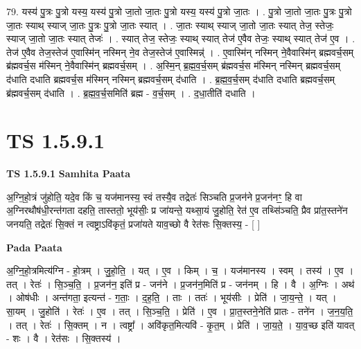 \documentclass[17pt]{extarticle}
\begin{document}
79. यस्य॑ पु॒त्रः पु॒त्रो यस्य॒ यस्य॑ पु॒त्रो जा॒तो जा॒तः पु॒त्रो यस्य॒ यस्य॑ पु॒त्रो जा॒तः । . पु॒त्रो जा॒तो जा॒तः पु॒त्रः पु॒त्रो जा॒तः स्याथ् स्याज् जा॒तः पु॒त्रः पु॒त्रो जा॒तः स्यात् । . जा॒तः स्याथ् स्याज् जा॒तो जा॒तः स्यात् तेज॒ स्तेजः॒ स्याज् जा॒तो जा॒तः स्यात् तेजः॑ । . स्यात् तेज॒ स्तेजः॒ स्याथ् स्यात् तेज॑ ए॒वैव तेजः॒ स्याथ् स्यात् तेज॑ ए॒व । . तेज॑ ए॒वैव तेज॒स्तेज॑ ए॒वास्मि॑न् नस्मिन् ने॒व तेज॒स्तेज॑ ए॒वास्मिन्न्॑ । . ए॒वास्मि॑न् नस्मिन् ने॒वैवास्मि॑न् ब्रह्मवर्च॒सम् ब्र॑ह्मवर्च॒स म॑स्मिन् ने॒वैवास्मि॑न् ब्रह्मवर्च॒सम् । . अ॒स्मि॒न् ब्र॒ह्म॒व॒र्च॒सम् ब्र॑ह्मवर्च॒स म॑स्मिन् नस्मिन् ब्रह्मवर्च॒सम् द॑धाति दधाति ब्रह्मवर्च॒स म॑स्मिन् नस्मिन् ब्रह्मवर्च॒सम् द॑धाति । . ब्र॒ह्म॒व॒र्च॒सम् द॑धाति दधाति ब्रह्मवर्च॒सम् ब्र॑ह्मवर्च॒सम् द॑धाति । . ब्र॒ह्म॒व॒र्च॒समिति॑ ब्रह्म - व॒र्च॒सम् । . द॒धा॒तीति॑ दधाति । \newline
\pagebreak
{}

\section{ TS 1.5.9.1 }

\textbf{TS 1.5.9.1 } \newline
\textbf{Samhita Paata} \newline

अ॒ग्नि॒हो॒त्रं जु॑होति॒ यदे॒व किं च॒ यज॑मानस्य॒ स्वं तस्यै॒व तद्रेतः॑ सिञ्चति प्र॒जन॑ने प्र॒जन॑नꣳ॒॒ हि वा अ॒ग्निरथौष॑धी॒रन्त॑गता दहति॒ तास्ततो॒ भूय॑सीः॒ प्र जा॑यन्ते॒ यथ्सा॒यं जु॒होति॒ रेत॑ ए॒व तथ्सि॑ञ्चति॒ प्रैव प्रा॑त॒स्तने॑न जनयति॒ तद्रेतः॑ सि॒क्तं न त्वष्ट्राऽवि॑कृतं॒ प्रजा॑यते याव॒च्छो वै रेत॑सः सि॒क्तस्य॒ - [ ] \newline

\textbf{Pada Paata} \newline

अ॒ग्नि॒हो॒त्रमित्य॑ग्नि - हो॒त्रम् । जु॒हो॒ति॒ । यत् । ए॒व । किम् । च॒ । यज॑मानस्य । स्वम् । तस्य॑ । ए॒व । तत् । रेतः॑ । सि॒ञ्च॒ति॒ । प्र॒जन॑न॒ इति॑ प्र - जन॑ने । प्र॒जन॑न॒मिति॑ प्र - जन॑नम् । हि । वै । अ॒ग्निः । अथ॑ । ओष॑धीः । अन्त॑गता॒ इत्यन्त॑ - ग॒ताः॒ । द॒ह॒ति॒ । ताः । ततः॑ । भूय॑सीः । प्रेति॑ । जा॒य॒न्ते॒ । यत् । सा॒यम् । जु॒होति॑ । रेतः॑ । ए॒व । तत् । सि॒ञ्च॒ति॒ । प्रेति॑ । ए॒व । प्रा॒त॒स्तने॒नेति॑ प्रातः - तने॑न । ज॒न॒य॒ति॒ । तत् । रेतः॑ । सि॒क्तम् । न । त्वष्ट्रा᳚ । अवि॑कृत॒मित्यवि॑ - कृ॒त॒म् । प्रेति॑ । जा॒य॒ते॒ । या॒व॒च्छ इति॑ यावत् - शः । वै । रेत॑सः । सि॒क्तस्य॑ ।  \newline
\end{document}
